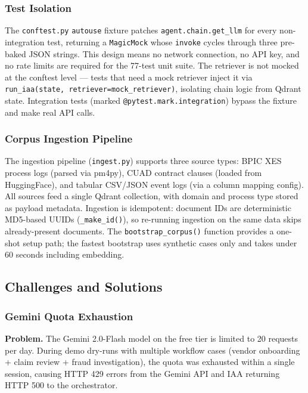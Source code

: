 \documentclass[12pt,a4paper]{article}
\begin{document}
\subsubsection{Test Isolation}

The \texttt{conftest.py} \texttt{autouse} fixture patches \texttt{agent.chain.get\_llm}
for every non-integration test, returning a \texttt{MagicMock} whose \texttt{invoke}
cycles through three pre-baked JSON strings. This design means no network connection,
no API key, and no rate limits are required for the 77-test unit suite. The retriever
is not mocked at the conftest level --- tests that need a mock retriever inject it
via \texttt{run\_iaa(state, retriever=mock\_retriever)}, isolating chain logic from
Qdrant state. Integration tests (marked \texttt{@pytest.mark.integration}) bypass
the fixture and make real API calls.

\subsubsection{Corpus Ingestion Pipeline}

The ingestion pipeline (\texttt{ingest.py}) supports three source types: BPIC XES
process logs (parsed via pm4py), CUAD contract clauses (loaded from HuggingFace),
and tabular CSV/JSON event logs (via a column mapping config). All sources feed a
single Qdrant collection, with domain and process type stored as payload metadata.
Ingestion is idempotent: document IDs are deterministic MD5-based UUIDs
(\texttt{\_make\_id()}), so re-running ingestion on the same data skips already-present
documents. The \texttt{bootstrap\_corpus()} function provides a one-shot setup path;
the fastest bootstrap uses synthetic cases only and takes under 60 seconds including
embedding.

\subsection{Challenges and Solutions}

\subsubsection{Gemini Quota Exhaustion}

\textbf{Problem.} The Gemini 2.0-Flash model on the free tier is limited to
20 requests per day. During demo dry-runs with multiple workflow cases (vendor
onboarding + claim review + fraud investigation), the quota was exhausted within
a single session, causing HTTP 429 errors from the Gemini API and IAA returning
HTTP 500 to the orchestrator.
\end{document}
